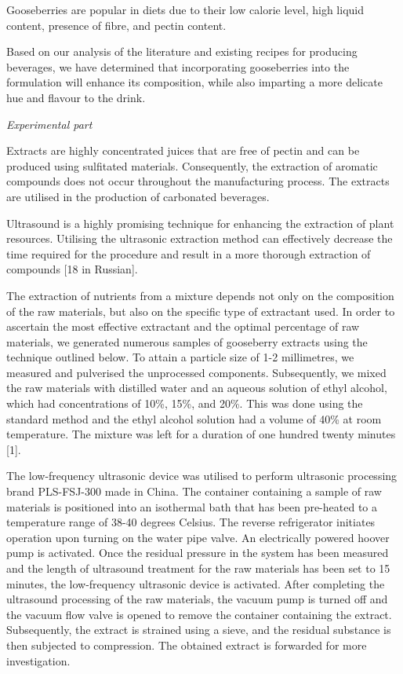 Gooseberries are popular in diets due to their low calorie level, high
liquid content, presence of fibre, and pectin content.~

Based on our analysis of the literature and existing recipes for
producing beverages, we have determined that incorporating gooseberries
into the formulation will enhance its composition, while also imparting
a more delicate hue and flavour to the drink.

\emph{Experimental part}

Extracts are highly concentrated juices that are free of pectin and can
be produced using sulfitated materials. Consequently, the extraction of
aromatic compounds does not occur throughout the manufacturing process.
The extracts are utilised in the production of carbonated beverages.~

Ultrasound is a highly promising technique for enhancing the extraction
of plant resources. Utilising the ultrasonic extraction method can
effectively decrease the time required for the procedure and result in a
more thorough extraction of compounds {[}18 in Russian{]}.~

The extraction of nutrients from a mixture depends not only on the
composition of the raw materials, but also on the specific type of
extractant used. In order to ascertain the most effective extractant and
the optimal percentage of raw materials, we generated numerous samples
of gooseberry extracts using the technique outlined below. To attain a
particle size of 1-2 millimetres, we measured and pulverised the
unprocessed components. Subsequently, we mixed the raw materials with
distilled water and an aqueous solution of ethyl alcohol, which had
concentrations of 10\%, 15\%, and 20\%. This was done using the standard
method and the ethyl alcohol solution had a volume of 40\% at room
temperature. The mixture was left for a duration of one hundred twenty
minutes {[}1{]}.~

The low-frequency ultrasonic device was utilised to perform ultrasonic
processing brand PLS-FSJ-300 made in China. The container containing a
sample of raw materials is positioned into an isothermal bath that has
been pre-heated to a temperature range of 38-40 degrees Celsius. The
reverse refrigerator initiates operation upon turning on the water pipe
valve. An electrically powered hoover pump is activated. Once the
residual pressure in the system has been measured and the length of
ultrasound treatment for the raw materials has been set to 15 minutes,
the low-frequency ultrasonic device is activated. After completing the
ultrasound processing of the raw materials, the vacuum pump is turned
off and the vacuum flow valve is opened to remove the container
containing the extract. Subsequently, the extract is strained using a
sieve, and the residual substance is then subjected to compression. The
obtained extract is forwarded for more investigation.~

